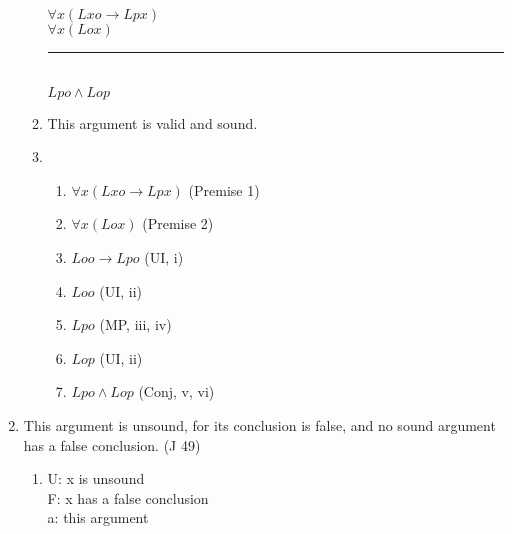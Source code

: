 \documentclass{article}
\begin{document}
\begin{enumerate}
\begin{enumerate}
                        $\forall x(Lxo \to Lpx)$\\
                        $\forall x(Lox)$\\
                        \rule{15em}{.5pt}\\
                        $Lpo \land Lop$
                  \item This argument is valid and sound.
                        \setcounter{enumii}{3}
                  \item \begin{enumerate}
                              \item $\forall x(Lxo \to Lpx)$ (Premise 1)
                              \item $\forall x(Lox)$ (Premise 2)
                              \item $Loo \to Lpo$ (UI, i)
                              \item $Loo$ (UI, ii)
                              \item $Lpo$ (MP, iii, iv)
                              \item $Lop$ (UI, ii)
                              \item $Lpo \land Lop$ (Conj, v, vi)
                        \end{enumerate}
            \end{enumerate}
      \item This argument is unsound, for its conclusion is false, and no sound argument has a false conclusion. (J 49)
            \begin{enumerate}
                  \item U: x is unsound\\
                        F: x has a false conclusion\\
                        a: this argument\\


\end{enumerate}
\end{enumerate}
\end{document}
